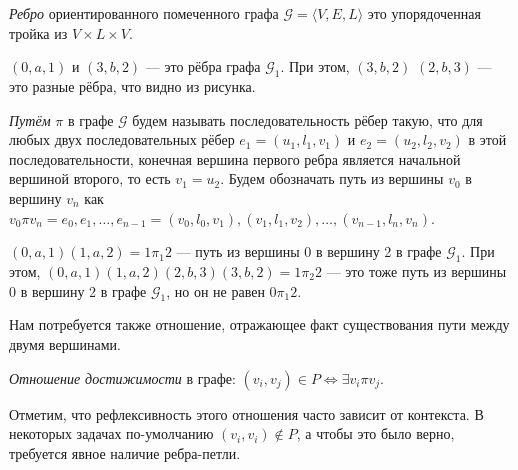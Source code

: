 \begin{definition}
  \textit{Ребро} ориентированного помеченного графа $\mathcal{G} = \langle V, E, L \rangle$ это упорядоченная тройка из $V \times L \times V$.
\end{definition}

\begin{example}
$(0,a,1)$  и $(3,b,2)$ --- это рёбра графа $\mathcal{G}_1$. При этом, $(3,b,2)$ $(2,b,3)$ --- это разные рёбра, что видно из рисунка.
\end{example}

\begin{definition}
  \textit{Путём} $\pi$ в графе $\mathcal{G}$ будем называть последовательность рёбер такую, что для любых двух последовательных рёбер $e_1=(u_1,l_1,v_1)$ и $e_2=(u_2,l_2,v_2)$ в этой последовательности, конечная вершина первого ребра является начальной вершиной второго, то есть $v_1 = u_2$. Будем обозначать путь из вершины $v_0$ в вершину $v_n$ как $v_0 \pi v_n = e_0,e_1, \dots, e_{n-1} = (v_0, l_0, v_1),(v_1,l_1,v_2),\dots,(v_{n-1},l_n,v_n)$.

\begin{center}
  \end{center}
\end{definition}

\begin{example}
$(0,a,1)(1,a,2) = 1\pi_1 2$  --- путь из вершины 0 в вершину 2 в графе $\mathcal{G}_1$.
При этом, $(0,a,1)(1,a,2)(2,b,3)(3,b,2) = 1\pi_2 2$ --- это тоже путь из вершины 0 в вершину 2 в графе $\mathcal{G}_1$, но он не равен $0\pi_1 2$.
\end{example}

Нам потребуется также отношение, отражающее факт существования пути между двумя вершинами.

\begin{definition}\label{def:reach}
  \textit{Отношение достижимости} в графе:
  $(v_i,v_j) \in P \iff \exists v_i \pi v_j$.
\end{definition}

Отметим, что рефлексивность этого отношения часто зависит от контекста.
В некоторых задачах по-умолчанию $(v_i,v_i) \notin P$, а чтобы это было верно, требуется явное наличие ребра-петли.

